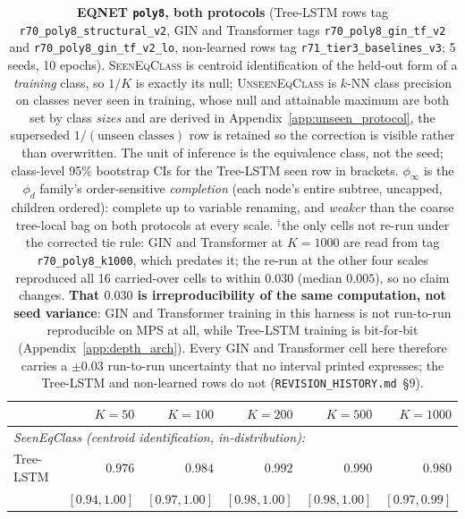 \begin{table}[h]
\centering
\begin{threeparttable}
\caption{\textbf{EQNET \texttt{poly8}, both protocols} (Tree-LSTM rows tag \texttt{r70\_poly8\_structural\_v2}, GIN and Transformer tags \texttt{r70\_poly8\_gin\_tf\_v2} and \texttt{r70\_poly8\_gin\_tf\_v2\_lo}, non-learned rows tag \texttt{r71\_tier3\_baselines\_v3}; 5 seeds, 10 epochs). \textsc{SeenEqClass} is centroid identification of the held-out form of a \emph{training} class, so $1/K$ is exactly its null; \textsc{UnseenEqClass} is $k$-NN class precision on classes never seen in training, whose null and attainable maximum are both set by class \emph{sizes} and are derived in Appendix~\ref{app:unseen_protocol}, the superseded $1/(\text{unseen classes})$ row is retained so the correction is visible rather than overwritten. The unit of inference is the equivalence class, not the seed; class-level 95\% bootstrap CIs for the Tree-LSTM seen row in brackets. $\phi_\infty$ is the $\phi_d$ family's order-sensitive \emph{completion} (each node's entire subtree, uncapped, children ordered): complete up to variable renaming, and \emph{weaker} than the coarse tree-local bag on both protocols at every scale. $^{\dagger}$the only cells not re-run under the corrected tie rule: GIN and Transformer at $K{=}1000$ are read from tag \texttt{r70\_poly8\_k1000}, which predates it; the re-run at the other four scales reproduced all 16 carried-over cells to within $0.030$ (median $0.005$), so no claim changes. \textbf{That $0.030$ is irreproducibility of the same computation, not seed variance}: GIN and Transformer training in this harness is not run-to-run reproducible on MPS at all, while Tree-LSTM training is bit-for-bit (Appendix~\ref{app:depth_arch}). Every GIN and Transformer cell here therefore carries a ${\pm}0.03$ run-to-run uncertainty that no interval printed expresses; the Tree-LSTM and non-learned rows do not (\texttt{REVISION\_HISTORY.md}~\S9).}
\label{tab:poly8_structural}
\small
\setlength{\tabcolsep}{4pt}
\begin{tabular}{l rrrrr}
\toprule
 & $K{=}50$ & $K{=}100$ & $K{=}200$ & $K{=}500$ & $K{=}1000$ \\
\midrule
\multicolumn{6}{l}{\emph{SeenEqClass (centroid identification, in-distribution):}} \\
Tree-LSTM & $0.976$ & $0.984$ & $0.992$ & $0.990$ & $0.980$ \\
\;{\scriptsize 95\% CI over classes} & {\scriptsize $[0.94,1.00]$} & {\scriptsize $[0.97,1.00]$} & {\scriptsize $[0.98,1.00]$} & {\scriptsize $[0.98,1.00]$} & {\scriptsize $[0.97,0.99]$} \\

\end{tabular}
\end{threeparttable}
\end{table}
